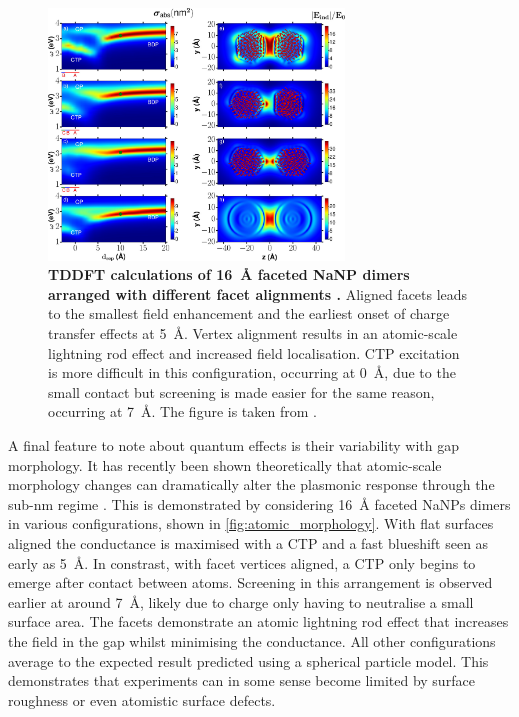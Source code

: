 \documentclass{article}
\begin{document}
\begin{figure}[bt]
\centering
\includegraphics[width=0.7\textwidth]{figures/literature/nl-2015-007593_0001}
\caption[TDDFT calculations of \SI{16}{\angstrom} faceted NaNP dimers arranged with different facet alignments \cite{barbry2015}]{\textbf{TDDFT calculations of \SI{16}{\angstrom} faceted NaNP dimers arranged with different facet alignments \cite{barbry2015}.} Aligned facets leads to the smallest field enhancement and the earliest onset of charge transfer effects at \SI{5}{\angstrom}. Vertex alignment results in an atomic-scale lightning rod effect and increased field localisation. CTP excitation is more difficult in this configuration, occurring at \SI{0}{\angstrom}, due to the small contact but screening is made easier for the same reason, occurring at \SI{7}{\angstrom}. The figure is taken from \cite{barbry2015}.}
\label{fig:atomic_morphology}
\end{figure}

A final feature to note about quantum effects is their variability with gap morphology. It has recently been shown theoretically that atomic-scale morphology changes can dramatically alter the plasmonic response through the sub-nm regime \cite{barbry2015}. This is demonstrated by considering \SI{16}{\angstrom} faceted NaNPs dimers in various configurations, shown in \autoref{fig:atomic_morphology}. With flat surfaces aligned the conductance is maximised with a CTP and a fast blueshift seen as early as \SI{5}{\angstrom}. In constrast, with facet vertices aligned, a CTP only begins to emerge after contact between atoms. Screening in this arrangement is observed earlier at around \SI{7}{\angstrom}, likely due to charge only having to neutralise a small surface area. The facets demonstrate an atomic lightning rod effect that increases the field in the gap whilst minimising the conductance. All other configurations average to the expected result predicted using a spherical particle model. This demonstrates that experiments can in some sense become limited by surface roughness or even atomistic surface defects.
\end{document}
